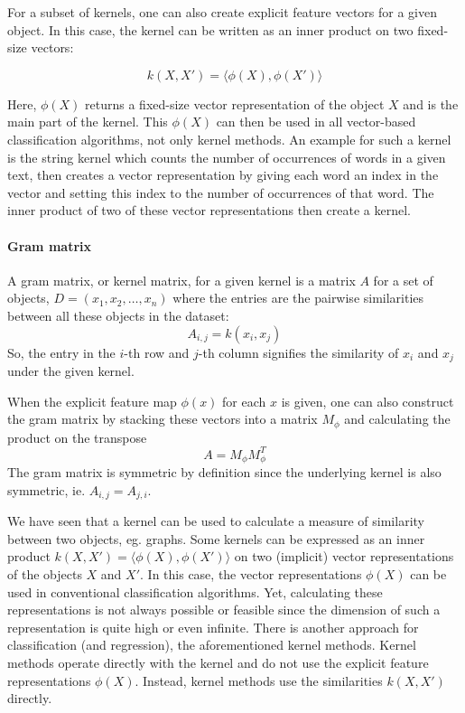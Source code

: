 For a subset of kernels, one can also create explicit feature vectors for a given object. In this case, the kernel can be written as an inner product on two fixed-size vectors:

\begin{equation*}
    k(X, X') = \langle \phi(X), \phi(X') \rangle
\end{equation*}

Here, $\phi(X)$ returns a fixed-size vector representation of the object $X$ and is the main part of the kernel.
This $\phi(X)$ can then be used in all vector-based classification algorithms, not only kernel methods.
An example for such a kernel is the string kernel which counts the number of occurrences of words in a given text, then creates a vector representation by giving each word an index in the vector and setting this index to the number of occurrences of that word. The inner product of two of these vector representations then create a kernel.

\paragraph{Gram matrix}
A gram matrix, or kernel matrix, for a given kernel is a matrix $A$ for a set of objects, $D = (x_1, x_2, \ldots, x_n)$ where the entries are the pairwise similarities between all these objects in the dataset:
\begin{equation*}
A_{i,j} = k(x_i, x_j)
\end{equation*}
So, the entry in the $i$-th row and $j$-th column signifies the similarity of $x_i$ and $x_j$ under the given kernel.

When the explicit feature map $\phi(x)$ for each $x$ is given, one can also construct the gram matrix by stacking these vectors into a matrix $M_{\phi}$ and calculating the product on the transpose
\begin{equation*}
A = M_{\phi} M_{\phi}^T
\end{equation*}
The gram matrix is symmetric by definition since the underlying kernel is also symmetric, ie. $A_{i,j} = A_{j, i}$.

We have seen that a kernel can be used to calculate a measure of similarity between two objects, eg. graphs.
Some kernels can be expressed as an inner product $k(X, X') = \langle \phi(X), \phi(X') \rangle$ on two (implicit) vector representations of the objects $X$ and $X'$.
In this case, the vector representations $\phi(X)$ can be used in conventional classification algorithms.
Yet, calculating these representations is not always possible or feasible since the dimension of such a representation is quite high or even infinite.
There is another approach for classification (and regression), the aforementioned kernel methods.
Kernel methods\cite[p.~291]{Bishop2006} operate directly with the kernel and do not use the explicit feature representations $\phi(X)$.
Instead, kernel methods use the similarities $k(X, X')$ directly.

